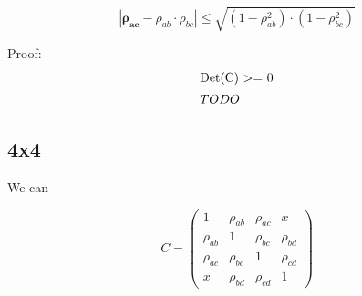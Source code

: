 \documentclass[a4paper]{article}
\begin{document}
\begin{theorem} \label{three} 
\begin{equation}
\boxed{
|\mathbf{\rho_{ac}} - \rho_{ab} \cdot \rho_{bc}| \leq \sqrt{(1 - \rho_{ab}^2) \cdot (1 - \rho_{bc}^2)}
}
\end{equation}

Proof:
\begin{gather*}
\shortintertext{Det(C) >= 0}
TODO
\end{gather*}
\end{theorem}

\subsection{4x4}
We can  

\begin{equation}
C = \begin{pmatrix}
1 & \rho_{ab} & \rho_{ac} & x \\
\rho_{ab} & 1 & \rho_{bc} & \rho_{bd} \\
\rho_{ac} & \rho_{bc} & 1 & \rho_{cd} \\
x & \rho_{bd} & \rho_{cd} & 1
\end{pmatrix}
\end{equation}
\end{document}
